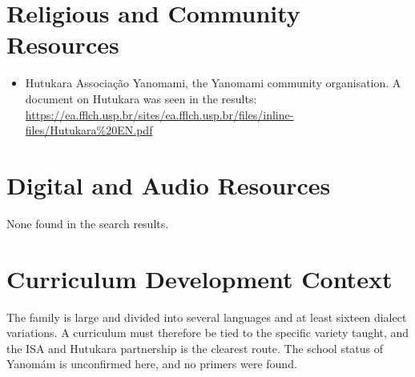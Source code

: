 \documentclass[12pt]{article}
\begin{document}
\section{Religious and Community Resources}
\begin{itemize}
\item Hutukara Associa\c{c}\~ao Yanomami, the Yanomami community organisation. A document on Hutukara was seen in the results: \url{https://ea.fflch.usp.br/sites/ea.fflch.usp.br/files/inline-files/Hutukara%20EN.pdf}
\end{itemize}

\section{Digital and Audio Resources}
None found in the search results.

\section{Curriculum Development Context}
The family is large and divided into several languages and at least sixteen dialect variations. A curriculum must therefore be tied to the specific variety taught, and the ISA and Hutukara partnership is the clearest route. The school status of Yanom\'am is unconfirmed here, and no primers were found.
\end{document}
